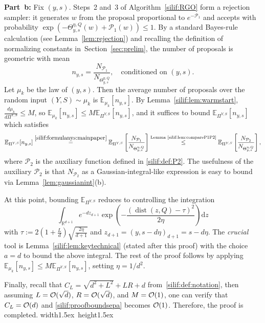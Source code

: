 \documentclass[11pt,letterpaper]{article}
\newcommand{\R}{\mathbb{R}}
\newcommand{\E}{\mathbb{E}}
\newcommand{\dist}{\operatorname{dist}}
\newcommand{\D}{\mathrm{d}}
\newcommand*{\QEDA}{\hfill\hbox{\vrule width1.5ex height1.5ex}}
\begin{document}
\textbf{Part~b:} Fix $(y,s)$. Steps~2 and~3 of Algorithm~\ref{silif:RGO} form a rejection sampler: it generates $w$ from the proposal proportional to $e^{-\mathcal{P}_1}$ and accepts with probability
$\exp \left(-\Theta^{\eta,Q}_{y,s}(w)+\mathcal{P}_1(w)\right)\le1$. 
By a standard Bayes-rule calculation (see Lemma~\ref{lem:rejection}) and recalling the definition of normalizing constants in~Section~\ref{sec:prelim}, the number of proposals is geometric with mean
\begin{equation}
\label{silif:formulanys:mainpaper}
    n_{y,s}=\frac{N_{\mathcal{P}_1}}{N_{\Theta^{\eta,Q}_{y,s}}}, \quad \text{conditioned on $(y,s)$.}
\end{equation} 
Let $\mu_k$ be the law of $(y,s)$. Then the average number of proposals
over the random input $(Y,S)\sim\mu_k$ is $\E_{\mu_k}[n_{y,s}]$.
By Lemma~\ref{silif:lem:warmstart}, $\frac{d\mu_k}{d\Pi^{Y,S}}\le M$, so $\E_{\mu_k}[n_{y,s}]\le M  \E_{\Pi^{Y,S}}[n_{y,s}]$, 
and it suffices to bound $\E_{\Pi^{Y,S}} [n_{y,s}]$ which satisfies
\[
    \E_{\Pi^{Y,S}} [n_{y,s}]\stackrel{\eqref{silif:formulanys:mainpaper}}{=}\E_{\Pi^{Y,S}} \left[\frac{N_{\mathcal{P}_1}}{N_{\Theta^{\eta,Q}_{y,s}}}\right]\stackrel{\text{Lemma~\ref{silif:lem:compareP1P2}}}{\leq} \E_{\Pi^{Y,S}} \left[\frac{N_{\mathcal{P}_2}}{N_{\Theta^{\eta,Q}_{y,s}}}\right], 
\]
where $\mathcal{P}_2$ is the auxiliary function defined in \eqref{silif:def:P2}. The usefulness of the auxiliary  $\mathcal{P}_2$ is that $N_{\mathcal{P}_2}$ as a Gaussian-integral-like expression is easy to bound via Lemma~\ref{lem:gaussianint}(b). 

At this point, bounding $\E_{\Pi^{Y,S}}$ reduces to controlling the integration
\[
    \int_{\R^{d+1}} e^{-d z_{d+1}}  
\exp \left(-\frac{(\dist(z,Q)-\tau)^2}{2\eta}\right)  \D z
\]
with $\tau:=2\left(1+\frac{L}{d}\right)\sqrt{\frac{2\eta}{d+1}}$ and $z_{d+1}=(y,s-d\eta)_{d+1}=s-d\eta$. The \emph{crucial} tool is Lemma~\ref{silif:lem:keytechnical} (stated after this proof) with the choice $a=d$ to bound the above integral. The rest of the proof follows by applying $\E_{\mu_k}[n_{y,s}]\le M  \E_{\Pi^{Y,S}}[n_{y,s}]$, setting $\eta=1/d^2$. 

Finally, recall that $C_L=\sqrt{d^2+L^2}+LR+d$ from~\eqref{silif:def:notation}, then assuming $L={\cal O}(\sqrt{d})$, $R={\cal O}(\sqrt{d})$, and $M={\cal O}(1)$, one can verify that $C_L={\cal O}(d)$ and \eqref{silif:proofboundsepa} becomes ${\cal O}(1)$. Therefore, the proof is completed.
\QEDA

\end{document}
